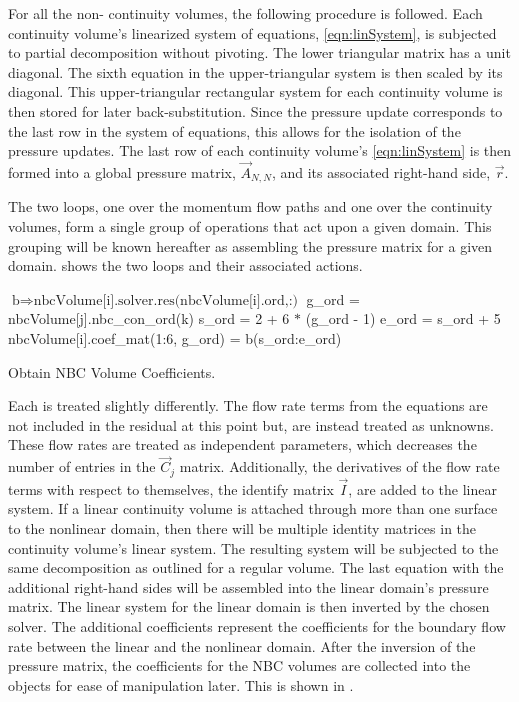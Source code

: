 For all the non- continuity volumes, the following procedure is followed.
Each continuity volume's linearized system of equations, \eqref{eqn:linSystem}, is subjected to partial  decomposition without pivoting.
The lower triangular matrix has a unit diagonal.
The sixth equation in the upper-triangular system is then scaled by its diagonal.
This upper-triangular rectangular system for each continuity volume is then stored for later back-substitution.
Since the pressure update corresponds to the last row in the system of equations, this allows for the isolation of the pressure updates.
The last row of each continuity volume's \eqref{eqn:linSystem} is then formed into a global pressure matrix, $\vec{A}_{N,N}$, and its associated right-hand side, $\vec{r}$.

The two loops, one over the momentum flow paths and one over the continuity volumes, form a single group of operations that act upon a given domain.
This grouping will be known hereafter as assembling the pressure matrix for a given domain.
 shows the two loops and their associated actions.

\begin{algo}[ht!]
\setlength{\baselineskip}{0.625\baselineskip}
\begin{algorithmic}[1]
	\Set $\text{b} \Rightarrow \text{nbcVolume[i].solver.res(nbcVolume[i].ord,:)}$
			\Set g\_ord = nbcVolume[j].nbc\_con\_ord(k)
			\Set s\_ord = 2 + 6 $*$ (g\_ord - 1)
			\Set e\_ord = s\_ord + 5
			\Set nbcVolume[i].coef\_mat(1:6, g\_ord) = b(s\_ord:e\_ord)
		\EndFor
	\EndFor
\EndFor
\end{algorithmic}
\caption{Obtain NBC Volume Coefficients.}
\label{alg:domDecompGetCoef}
\end{algo}

Each  is treated slightly differently.
The flow rate terms from the equations are not included in the residual at this point but, are instead treated as unknowns.
These flow rates are treated as independent parameters, which decreases the number of entries in the $\vec{C}_{j}$ matrix.
Additionally, the derivatives of the flow rate terms with respect to themselves, the identify matrix $\vec{I}$, are added to the linear system.
If a linear continuity volume is attached through more than one surface to the nonlinear domain, then there will be multiple identity matrices in the continuity volume's linear system.
The resulting system will be subjected to the same  decomposition as outlined for a regular volume.
The last equation with the additional right-hand sides will be assembled into the linear domain's pressure matrix.
The linear system for the linear domain is then inverted by the chosen solver.
The additional coefficients represent the coefficients for the boundary flow rate between the linear and the nonlinear domain.
After the inversion of the pressure matrix, the coefficients for the NBC volumes are collected into the  objects for ease of manipulation later.
This is shown in .

